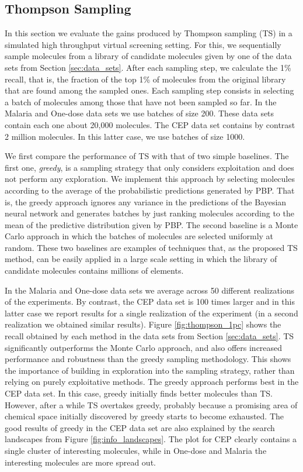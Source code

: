 \subsection{Thompson Sampling}

In this section we evaluate the gains produced by Thompson sampling (TS) in a simulated high throughput virtual screening setting. For this, we sequentially sample molecules from a library of candidate molecules given by one of the data sets from Section \ref{sec:data_sets}. After each sampling step, we calculate the 1\% recall, that is, the fraction of the top 1\% of molecules from the original library that are found among the sampled ones. Each sampling step consists in selecting a batch of molecules among those that have not been sampled so far. In the Malaria and One-dose data sets we use batches of size 200. These data sets contain each one about 20,000 molecules. The CEP data set contains by contrast 2 million molecules. In this latter case, we use batches of size 1000. 

We first compare the performance of TS with that of two simple baselines. The first one, \emph{greedy}, is a sampling strategy that only considers exploitation and does not perform any exploration. We implement this approach by selecting molecules according to the average of the probabilistic predictions generated by PBP. That is, the greedy approach ignores any variance in the predictions of the Bayesian neural network and generates batches by just ranking molecules according to the mean of the predictive distribution given by PBP. The second baseline is a Monte Carlo approach in which the batches of molecules are selected uniformly at random. These two baselines are examples of techniques that, as the proposed TS method, can be easily applied in a large scale setting in which the library of candidate molecules contains millions of elements.

In the Malaria and One-dose data sets we average across 50 different realizations of the experiments. By contrast, the CEP data set is 100 times larger and in this latter case we report results for a single realization of the experiment (in a second realization we obtained similar results). 
Figure \ref{fig:thompson_1pc} shows the recall obtained by each method in the data sets from 
Section \ref{sec:data_sets}. TS significantly outperforms the Monte Carlo approach, and also offers increased performance and robustness than the greedy sampling methodology. This shows the importance of building in exploration into the sampling strategy, rather than relying on purely exploitative methods. The greedy approach performs best in the CEP data set. In this case, greedy initially finds better molecules than TS. However, after a while TS overtakes greedy, probably because a promising area of chemical space 
initially discovered by greedy starts to become exhausted. The good results of greedy in the CEP data set are also explained by the search landscapes from Figure \ref{fig:info_landscapes}. The plot for CEP clearly contains a single cluster of interesting molecules, while in One-dose and Malaria the interesting molecules are more spread out.

